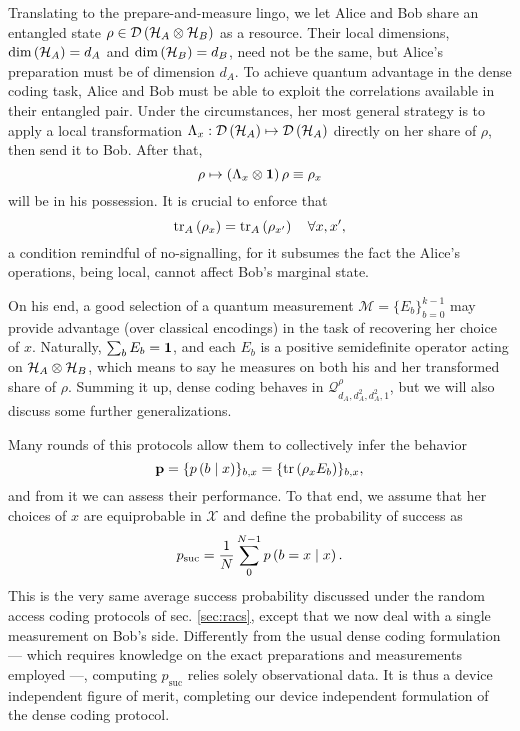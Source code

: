         Translating to the prepare-and-measure lingo, we let Alice and Bob share an entangled state $\rho \in \mathcal{D}\left( \mathcal{H}_A \otimes \mathcal{H}_B \right)$ as a resource. Their local dimensions, $\text{dim} \left( \mathcal{H}_A \right) = d_A$ and $\text{dim} \left( \mathcal{H}_B \right) = d_B$, need not be the same, but Alice's preparation must be of dimension $d_A$. To achieve quantum advantage in the dense coding task, Alice and Bob must be able to exploit the correlations available in their entangled pair. Under the circumstances, her most general strategy is to apply a local transformation $\Lambda_x : \mathcal{D}\left( \mathcal{H}_A \right) \mapsto \mathcal{D}\left( \mathcal{H}_A \right)$ directly on her share of $\rho$, then send it to Bob. After that,
        $$
            \rho \mapsto \left( \Lambda_x \otimes \mathbf{1} \right)\rho \equiv \rho_x
        $$
        will be in his possession. It is crucial to enforce that
        $$
            \text{tr}_{A}\left( \rho_x \right) = \text{tr}_{A}\left( \rho_{x^\prime} \right) \quad\forall x, x^\prime ,
        $$
        a condition remindful of no-signalling, for it subsumes the fact the Alice's operations, being local, cannot affect Bob's marginal state.
        
        On his end, a good selection of a quantum measurement $\mathcal{M} = \{ E_b \}_{b=0}^{k-1}$ may provide advantage (over classical encodings) in the task of recovering her choice of $x$. Naturally, $\sum_b E_b = \mathbf{1}$, and each $E_b$ is a positive semidefinite operator acting on $\mathcal{H}_A \otimes \mathcal{H}_B$, which means to say he measures on both his and her transformed share of $\rho$. Summing it up, dense coding behaves in $\mathcal{Q}^\rho_{d_A,d_A^2,d_A^2,1}$, but we will also discuss some further generalizations.
        
        Many rounds of this protocols allow them to collectively infer the behavior
        $$
            \mathbf{p} = \{ p \left( b \mid x \right) \}_{b,x} = \{ \text{tr}\left( \rho_x E_b  \right) \}_{b,x} ,
        $$
        and from it we can assess their performance. To that end, we assume that her choices of $x$ are equiprobable in $\mathcal{X}$ and define the probability of success as
        $$
            p_{\text{suc}} = \frac{1}{N} \sum_0^{N-1} p \left( b=x \mid x \right) .
        $$
        This is the very same average success probability discussed under the random access coding protocols of sec. \ref{sec:racs}, except that we now deal with a single measurement on Bob's side. Differently from the usual dense coding formulation --- which requires knowledge on the exact preparations and measurements employed ---, computing $p_{\text{suc}}$ relies solely observational data. It is thus a device independent figure of merit, completing our device independent formulation of the dense coding protocol.
        
